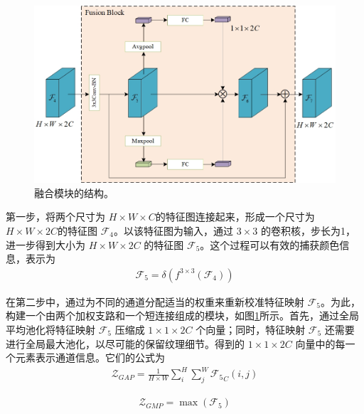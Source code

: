 \documentclass[a4paper]{ctexart}
\begin{document}
	\begin{figure}[h!]
		\centering 
		\includegraphics[width=0.7\columnwidth]{picture/LLIE/My Architecture/Fusion Block}
		\caption{
			\label{fig: Fusion Block} 
			融合模块的结构。
		}
	\end{figure}
	
	第一步，将两个尺寸为 $H \times W \times C$的特征图连接起来，形成一个尺寸为 $H \times W \times 2C$的特征图 $\mathcal{F}_4$。以该特征图为输入，通过 $3 \times 3$ 的卷积核，步长为1，进一步得到大小为 $H \times W \times 2C$ 的特征图 $\mathcal{F}_5$。这个过程可以有效的捕获颜色信息，表示为 
	\begin{equation}
		\begin{aligned}
			\mathcal{F}_5 = \delta \left( f^{3 \times 3} (\mathcal{F}_4)\right)
		\end{aligned}
		\label{eq: capture color information}
	\end{equation}
	
	在第二步中，通过为不同的通道分配适当的权重来重新校准特征映射 $\mathcal{F}_5$。为此，构建一个由两个加权支路和一个短连接组成的模块，如图\ref{fig: Fusion Block}所示。首先，通过全局平均池化将特征映射 $\mathcal{F}_5$ 压缩成 $1 \times 1 \times 2C$ 个向量；同时，特征映射 $\mathcal{F}_5$ 还需要进行全局最大池化，以尽可能的保留纹理细节。得到的 $1 \times 1 \times 2C$ 向量中的每一个元素表示通道信息。它们的公式为
	\begin{equation}
		\begin{aligned}
			\mathcal{Z}_{GAP} = \frac{1}{H \times W} \sum_{i}^{H} \sum_{j}^{W} {\mathcal{F}_5}_C (i,j)
		\end{aligned}
		\label{eq: avgpool}
	\end{equation}
	
	\begin{equation}
		\begin{aligned}
			\mathcal{Z}_{GMP} = \max \left( \mathcal{F}_5 \right)
		\end{aligned}
		\label{eq: maxpool}
	\end{equation}
	
\end{document}

